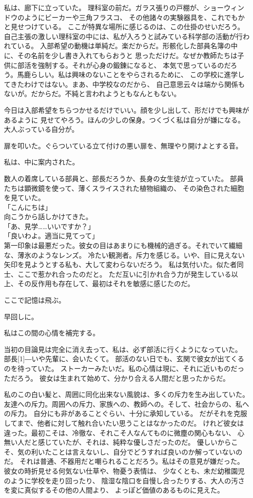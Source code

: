 \documentclass[../IHMain]{subfiles}
\begin{document}
私は、廊下に立っていた。
理科室の前だ。ガラス張りの戸棚が、ショーウィンドウのようにビーカーや三角フラスコ、
その他諸々の実験器具を、これでもかと見せつけている。
ここが特異な場所に感じるのは、この仕掛のせいだろう。
自己主張の激しい理科室の中には、私が入ろうと試みている科学部の活動が行われている。
入部希望の動機は単純だ。楽だからだ。形骸化した部員名簿の中に、その名前を少し書き入れてもらおうと
思っただけだ。なぜか教師たちは子供に部活を強制する。それが心身の鍛錬になると、
本気で思っているのだろう。馬鹿らしい。私は興味のないことをやらされるために、
この学校に進学してきたわけではない。まあ、中学校なのだから、
自己意思云々は端から関係もないが。だからだ。不純と言われようともなんともない。

今日は入部希望をちらつかせるだけでいい。顔を少し出して、形だけでも興味があるように
見せてやろう。ほんの少しの保身。つくづく私は自分が嫌になる。
大人ぶっている自分が。

扉を叩いた。ぐらついている立て付けの悪い扉を、無理やり開けよとする音。

私は、中に案内された。

数人の着席している部員と、部長だろうか、長身の女生徒が立っていた。
部員たちは顕微鏡を使って、薄くスライスされた植物組織の、
その染色された細胞を見ていた。\\
「こんにちは」\\
向こうから話しかけてきた。\\
「あ、見学……いいですか？」\\
「良いわよ。適当に見てって」\\
第一印象は最悪だった。彼女の目はあまりにも機械的過ぎる。それでいて繊細な、薄氷のようなレンズ。
冷たい観測者。斥力を感じる。いや、目に見えない矢印を見ようとする私も、大して変わらないだろう。
私は気付いた。似た者同士、ここで惹かれ合ったのだと。
ただ互いに引かれ合う力が発生している以上、その反作用も存在して、最初はそれを敏感に感じたのだ。

ここで記憶は飛ぶ。

早回しに。

私はこの間の心情を補完する。

当初の目論見は完全に消え去って、私は、必ず部活に行くようになっていた。
部長\scalebox{3}[1]{―}いや先輩に、会いたくて。
部活のない日でも、玄関で彼女が出てくるのを待っていた。
ストーカーみたいだ。私の心情は現に、それに近いものだっただろう。
彼女は生まれて始めて、分かり合える人間だと思ったからだ。

私のこの白い髪と、周囲に同化出来ない風貌は、多くの斥力を生み出していた。
友達への斥力。周囲への斥力、家族への、教師への。そして、社会からの、私への斥力。
自分にも非があることぐらい、十分に承知している。
だがそれを克服してまで、他者に対して触れ合いたい思うことはなかったのだ。
けれど彼女は違った。最初こそは、冷徹な、それこそ人なんてものに微塵の関心もない、
心無い人だと感じていたが、それは、純粋な優しさだったのだ。
優しいからこそ、気の利いたことは言えないし、自分でどうすれば良いのか解っていないのだ。
それは普通、不器用だと嘲られることだろう。私はその意見が嫌だった。
彼女の時折見せる何気ない仕草や、物憂う表情は、
少なくとも、未だ幼稚園児のように学校を走り回ったり、
陰湿な陰口を自慢し合ったりする、大人の汚さを変に真似するその他の人間より、
よっぽど価値のあるものに見えた。
\end{document}
